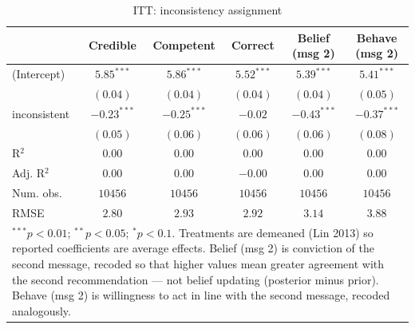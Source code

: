 
\begin{table}
\begin{center}
\begin{tabular}{l c c c c c}
\hline
 & Credible & Competent & Correct & Belief (msg 2) & Behave (msg 2) \\
\hline
(Intercept)  & $5.85^{***}$  & $5.86^{***}$  & $5.52^{***}$ & $5.39^{***}$  & $5.41^{***}$  \\
             & $(0.04)$      & $(0.04)$      & $(0.04)$     & $(0.04)$      & $(0.05)$      \\
inconsistent & $-0.23^{***}$ & $-0.25^{***}$ & $-0.02$      & $-0.43^{***}$ & $-0.37^{***}$ \\
             & $(0.05)$      & $(0.06)$      & $(0.06)$     & $(0.06)$      & $(0.08)$      \\
\hline
R$^2$        & $0.00$        & $0.00$        & $0.00$       & $0.00$        & $0.00$        \\
Adj. R$^2$   & $0.00$        & $0.00$        & $-0.00$      & $0.00$        & $0.00$        \\
Num. obs.    & $10456$       & $10456$       & $10456$      & $10456$       & $10456$       \\
RMSE         & $2.80$        & $2.93$        & $2.92$       & $3.14$        & $3.88$        \\
\hline
\multicolumn{6}{l}{\scriptsize{\item $^{***}p<0.01$; $^{**}p<0.05$; $^{*}p<0.1$. Treatments are demeaned (Lin 2013) so reported coefficients are average effects. Belief (msg 2) is conviction of the second message, recoded so that higher values mean greater agreement with the second recommendation --- not belief updating (posterior minus prior). Behave (msg 2) is willingness to act in line with the second message, recoded analogously.}}
\end{tabular}
\caption{ITT: inconsistency assignment}
\label{table:coefficients}
\end{center}
\end{table}

